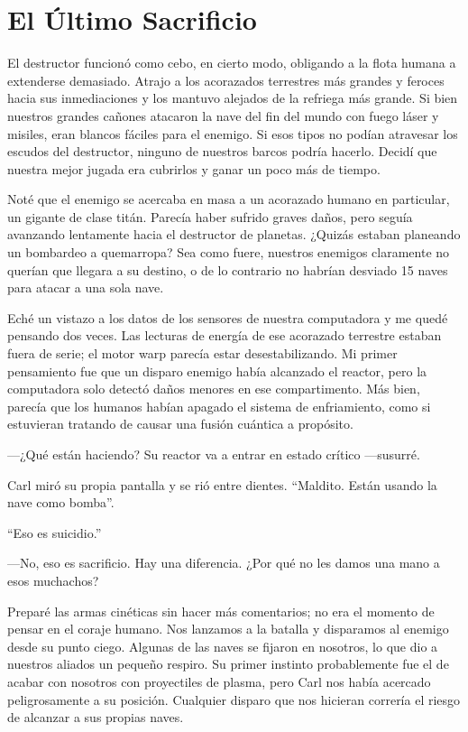 \chapter{El Último Sacrificio}\label{sec:el-ultimo-sacrificio}

El destructor funcionó como cebo, en cierto modo, obligando a la flota humana a extenderse demasiado. Atrajo a los acorazados terrestres más grandes y feroces hacia sus inmediaciones y los mantuvo alejados de la refriega más grande. Si bien nuestros grandes cañones atacaron la nave del fin del mundo con fuego láser y misiles, eran blancos fáciles para el enemigo. Si esos tipos no podían atravesar los escudos del destructor, ninguno de nuestros barcos podría hacerlo. Decidí que nuestra mejor jugada era cubrirlos y ganar un poco más de tiempo.

Noté que el enemigo se acercaba en masa a un acorazado humano en particular, un gigante de clase titán. Parecía haber sufrido graves daños, pero seguía avanzando lentamente hacia el destructor de planetas. ¿Quizás estaban planeando un bombardeo a quemarropa? Sea como fuere, nuestros enemigos claramente no querían que llegara a su destino, o de lo contrario no habrían desviado 15 naves para atacar a una sola nave.

Eché un vistazo a los datos de los sensores de nuestra computadora y me quedé pensando dos veces. Las lecturas de energía de ese acorazado terrestre estaban fuera de serie; el motor warp parecía estar desestabilizando. Mi primer pensamiento fue que un disparo enemigo había alcanzado el reactor, pero la computadora solo detectó daños menores en ese compartimento. Más bien, parecía que los humanos habían apagado el sistema de enfriamiento, como si estuvieran tratando de causar una fusión cuántica a propósito.

—¿Qué están haciendo? Su reactor va a entrar en estado crítico —susurré.

Carl miró su propia pantalla y se rió entre dientes. ``Maldito. Están usando la nave como bomba''.

``Eso es suicidio.''

—No, eso es sacrificio. Hay una diferencia. ¿Por qué no les damos una mano a esos muchachos?

Preparé las armas cinéticas sin hacer más comentarios; no era el momento de pensar en el coraje humano. Nos lanzamos a la batalla y disparamos al enemigo desde su punto ciego. Algunas de las naves se fijaron en nosotros, lo que dio a nuestros aliados un pequeño respiro. Su primer instinto probablemente fue el de acabar con nosotros con proyectiles de plasma, pero Carl nos había acercado peligrosamente a su posición. Cualquier disparo que nos hicieran correría el riesgo de alcanzar a sus propias naves.

